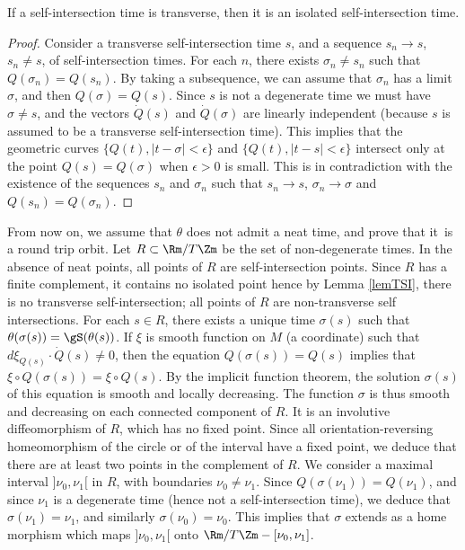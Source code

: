 \begin{lem}\label{lemTSI}
If a self-intersection time is transverse, then it is an isolated self-intersection time.
\end{lem}

\begin{proof}
Consider a transverse self-intersection time $s$, and a sequence $s_n\to s$, $s_n\neq s$, of self-intersection times. For each $n$, there exists $\sigma _n \neq s_n$ such that
$Q(\sigma _n)=Q(s_n)$. By taking a subsequence, we can assume that $\sigma _n$ has a limit $\sigma $, and then $Q(\sigma )=Q(s)$.
Since $s$ is not a degenerate time we must have $\sigma\neq s$, and the vectors $\dot Q(s)$ and $\dot Q(\sigma )$ are linearly independent (because $s$ is assumed to be a transverse self-intersection time).
This implies that the geometric curves $\{Q(t), |t-\sigma|<\epsilon \}$ and $\{Q(t), |t-s|<\epsilon \}$ intersect only at the point $Q(s)=Q(\sigma)$ when $\epsilon>0$ is small. This is in contradiction with the existence of the sequences $s_n$ and $\sigma_n$ such that $s_n\to s$, $\sigma_n\to \sigma$ and $Q(s_n)=Q(\sigma_n)$.
\end{proof}

From now on, we assume that $\theta$ does not admit a neat time, and prove that it~is a round trip orbit.
Let $R\subset \Rm/T\Zm$ be the set of non-degenerate times.
In the absence of neat points, all points of $R$ are self-intersection points. Since $R$ has a finite complement, it contains no isolated point hence by Lemma \ref{lemTSI}, there is no transverse self-intersection; all points of $R$ are
non-transverse self intersections.
For each $s\in R$, there exists a unique time $\sigma(s)$ such that $\theta(\sigma(s))=\gS(\theta(s))$.
If $\xi$ is smooth function on $M$ (a coordinate) such that $d\xi_{Q(s)}\cdot \dot Q(s)\neq 0$, then the equation $Q(\sigma(s))=Q(s)$ implies that $\xi\circ Q(\sigma(s))=\xi\circ Q(s)$.
By the implicit function theorem, the solution $\sigma(s)$ of this equation is smooth and locally decreasing. The function $\sigma$ is thus smooth
and decreasing on each connected component of $R$.
It is an involutive diffeomorphism of $R$,
which has no fixed point. Since all orientation-reversing homeomorphism of the circle or of the interval have a fixed point, we deduce that there are at least two points
in the complement of $R$.
We consider a maximal interval $]\nu_0,\nu_1[$ in $R$, with boundaries $\nu_0\neq \nu_1$. Since $Q(\sigma(\nu_1))=Q(\nu_1)$, and since $\nu_1$ is a degenerate time (hence not a self-intersection time),
we deduce that $\sigma(\nu_1)=\nu_1$, and similarly $\sigma(\nu_0)=\nu_0$. This implies that $\sigma$ extends as a home morphism which maps
$]\nu_0, \nu_1[$ onto $\Rm/T\Zm-[\nu_0, \nu_1]$.

